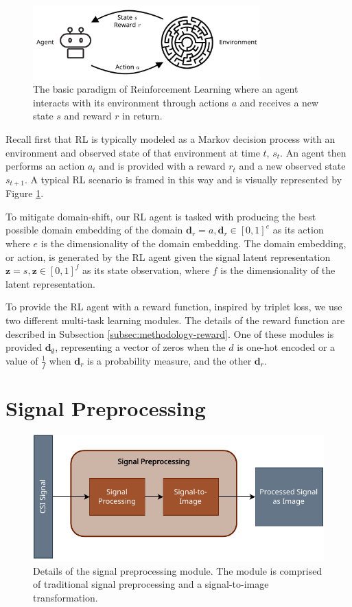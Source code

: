 \begin{figure}
	\centering
	\includegraphics[width=0.78\textwidth]{figures/rl_paradigm}
	\caption{The basic paradigm of Reinforcement Learning where an agent interacts with its environment through actions $a$ and receives a new state $s$ and reward $r$ in return.}\label{fig:rl-paradigm}
\end{figure}
Recall first that RL is typically modeled as a Markov decision process with an environment and observed state of that environment at time $t$, $s_t$. An agent then performs an action $a_t$ and is provided with a reward $r_t$ and a new observed state $s_{t+1}$.
A typical RL scenario is framed in this way and is visually represented by Figure \ref{fig:rl-paradigm}.

To mitigate domain-shift, our RL agent is tasked with producing the best possible domain embedding of the domain $\boldsymbol{d}_r = a, \boldsymbol{d}_r \in [0, 1]^e$ as its action where $e$ is the dimensionality of the domain embedding.
The domain embedding, or action, is generated by the RL agent given the signal latent representation $\boldsymbol{z} = s, \boldsymbol{z} \in [0, 1]^f$ as its state observation, where $f$ is the dimensionality of the latent representation.

To provide the RL agent with a reward function, inspired by triplet loss, we use two different multi-task learning modules.
The details of the reward function are described in Subsection \ref{subsec:methodology-reward}.
One of these modules is provided $\boldsymbol{d}_{\emptyset}$, representing a vector of zeros when the $d$ is one-hot encoded or a value of $\frac{1}{f}$ when $\boldsymbol{d}_r$ is a probability measure, and the other $\boldsymbol{d}_{r}$.

\section{Signal Preprocessing}\label{sec:methodology-signal-preprocessing}

\begin{figure}
	\centering
	\includegraphics[width=0.8\linewidth]{figures/signal_preprocessing_diagram.pdf}
	\caption{Details of the signal preprocessing module. The module is comprised of traditional signal preprocessing and a signal-to-image transformation.}
	\label{fig:signal-preprocessing-diagram}
\end{figure}

